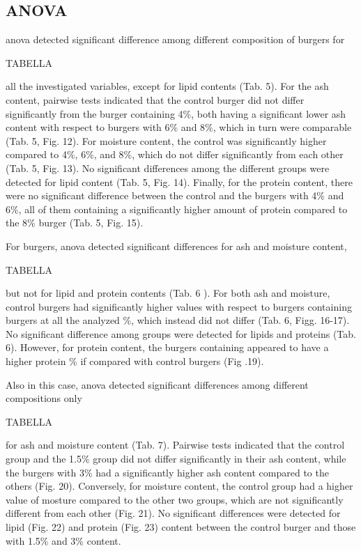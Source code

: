 \subsection{ANOVA}
\gls{anova} detected significant difference among different composition of  burgers for 

TABELLA

all the investigated variables, except for lipid contents (Tab. 5). For the ash content, pairwise tests indicated that the control burger did not differ significantly from the burger containing 4\%, both having a significant lower ash content with respect to burgers with 6\% and 8\%, which in turn were comparable (Tab. 5, Fig. 12).
For moisture content, the control was significantly higher compared to 4\%, 6\%, and 8\%, which do not differ significantly from each other (Tab. 5, Fig. 13). No significant differences among the different groups were detected for lipid content (Tab. 5, Fig. 14). Finally, for the protein content, there were no significant difference between the control and the burgers with 4\% and 6\%, all of them containing a significantly higher amount of protein compared to the 8\% burger (Tab. 5, Fig. 15).



For  burgers, \gls{anova} detected significant differences for ash and moisture content, 

TABELLA

but not for lipid and protein contents (Tab. 6 ). For both ash and moisture, control burgers had significantly higher values with respect to burgers containing  burgers at all the analyzed \%, which instead did not differ (Tab. 6, Figg. 16-17). No significant difference among groups were detected for lipids and proteins (Tab. 6). However, for protein content, the burgers containing  appeared to have a higher protein \% if compared with control burgers (Fig .19).

Also in this case, \gls{anova} detected significant differences among different compositions only

TABELLA

for ash and moisture content (Tab. 7). Pairwise tests indicated that the control group and the 1.5\% group did not differ significantly in their ash content, while the burgers with 3\%  had a significantly higher ash content compared to the others (Fig. 20). Conversely, for moisture content, the control group had a higher value of mosture compared to the other two groups, which are not significantly different from each other (Fig. 21). No significant differences were detected for lipid (Fig. 22) and protein (Fig. 23) content between the control burger and those with 1.5\% and 3\% content.

